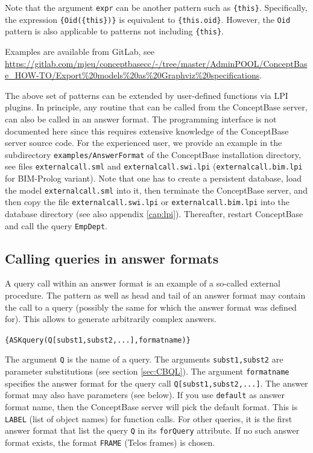 Note that the argument {\tt expr} can be another pattern such as \verb+{this}+. Specifically, the expression
\verb+{Oid({this})}+ is equivalent to \verb+{this.oid}+. However, the {\tt Oid} pattern is
also applicable to patterns not including \verb+{this}+.

Examples are available from GitLab, see \url{https://gitlab.com/mjeu/conceptbasecc/-/tree/master/AdminPOOL/ConceptBase_HOW-TO/Export%20models%20as%20Graphviz%20specifications}.

The above set of patterns can be extended by user-defined functions via LPI plugins.
In principle, any routine that can be called from
the ConceptBase server, can also be called in an answer format. 
The programming interface is not documented here since this requires
extensive knowledge of the ConceptBase server source code. 
For the experienced user, we provide an example in  the 
subdirectory {\tt examples/AnswerFormat} of the ConceptBase installation
directory, see files {\tt externalcall.sml} and
{\tt externalcall.swi.lpi} ({\tt externalcall.bim.lpi} for BIM-Prolog variant). 
Note that one has to create a persistent database, load the model {\tt externalcall.sml} into it, then terminate
the ConceptBase server, and then copy the file {\tt externalcall.swi.lpi} or {\tt externalcall.bim.lpi} 
into the database directory (see also appendix \ref{cap:lpi}). 
Thereafter, restart ConceptBase and call the query {\tt EmpDept}.


\subsection{Calling queries in answer formats}
\label{subsec:askquery}

A query call within an answer format is an example of a so-called external procedure.
The pattern as well as head and tail of an answer format may contain the call to a query (possibly the same for which the answer format was
defined for). This allows to generate arbitrarily complex answers.

\verb+{ASKquery(Q[subst1,subst2,...],formatname)}+

The argument {\tt Q} is the name of a query. The arguments {\tt subst1,subst2} are parameter substitutions (see section \ref{sec:CBQL}). The argument
{\tt formatname} specifies the answer format for the query call {\tt Q[subst1,subst2,...]}. The answer format may also have parameters (see below).
If you use {\tt default} as answer format name, then the ConceptBase server will pick the default format. This is {\tt LABEL} (list of object names) for
function calls.
For other queries, it is the first answer format that list the query {\tt Q} in its {\tt forQuery} attribute. If no such answer format exists,
the format {\tt FRAME} (Telos frames) is chosen.


